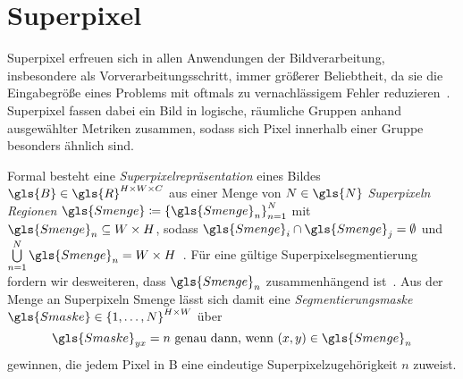 \section{Superpixel}
\label{superpixel}

Superpixel erfreuen sich in allen Anwendungen der Bildverarbeitung, insbesondere als Vorverarbeitungsschritt, immer größerer Beliebtheit, da sie die Eingabegröße eines Problems mit oftmals zu vernachlässigem Fehler reduzieren~\cite{Gadde}.
Superpixel fassen dabei ein Bild in logische, räumliche Gruppen anhand ausgewählter Metriken zusammen, sodass sich Pixel innerhalb einer Gruppe besonders ähnlich sind.

Formal besteht eine \emph{Superpixelrepräsentation} eines Bildes $\gls{B} \in \gls{R}^{H \times W \times C}$ aus einer Menge von $N \in \gls{N}$ \emph{Superpixeln} \bzw{} \emph{Regionen} $\gls{Smenge} \coloneqq {\left\{\gls{Smenge}_n\right\}}_{n=1}^N$ mit $\gls{Smenge}_n \subseteq W \times H$, sodass $\gls{Smenge}_i \cap \gls{Smenge}_j = \emptyset$ und $\bigcup\limits_{n=1}^N \gls{Smenge}_n = W \times H$~\cite{super}.
Für eine gültige Superpixelsegmentierung fordern wir desweiteren, dass $\gls{Smenge}_n$ zusammenhängend ist~\cite{super}.
Aus der Menge an Superpixeln \gls{Smenge} lässt sich damit eine \emph{Segmentierungsmaske} $\gls{Smaske} \in {\left\{1, \ldots, N\right\}}^{H \times W}$ über
\begin{equation*}
  \gls{Smaske}_{yx} = n\,\, \text{\gdw{} } \left(x,y\right) \in \gls{Smenge}_n
\end{equation*}
gewinnen, die jedem Pixel in \gls{B} eine eindeutige Superpixelzugehörigkeit $n$ zuweist.

